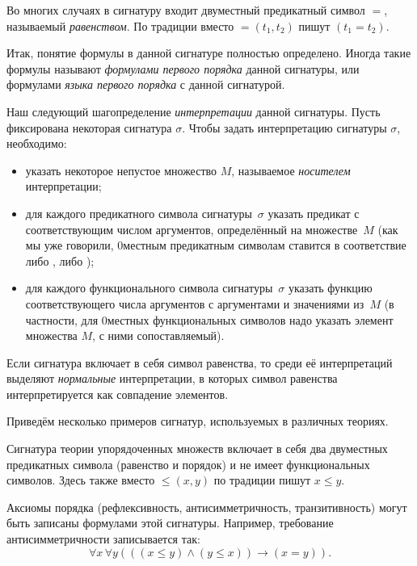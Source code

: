 Во многих случаях в сигнатуру входит двуместный предикатный
символ $=$, называемый \emph{равенством}.%
По традиции вместо $=(t_1,t_2)$ пишут $(t_1=t_2)$.

Итак, понятие формулы в данной сигнатуре полностью определено.
Иногда такие формулы называют \emph{формулами первого порядка}%
данной сигнатуры, или формулами \emph{языка первого порядка}%
с данной сигнатурой.

Наш следующий шаг\т определение \emph{интерпретации}%
данной
сигнатуры. Пусть фиксирована некоторая сигнатура $\sigma$. Чтобы
задать интерпретацию сигнатуры $\sigma$, необходимо:
\begin{itemize}
        \item
указать некоторое непустое множество $M$, называемое
\emph{носителем}%
%
интерпретации;
        \item
для каждого предикатного символа сигнатуры~$\sigma$ указать
предикат с соответствующим числом аргументов, определённый
на множестве~$M$ (как мы уже говорили,
$0$\д местным предикатным символам ставится в соответствие
либо \И, либо \Л);
        \item
для каждого функционального символа сигнатуры~$\sigma$
указать функцию соответствующего числа аргументов с аргументами
и значениями из~$M$ (в частности, для $0$\д местных функциональных
символов надо указать элемент множества $M$, с ними сопоставляемый).
\end{itemize}

Если сигнатура включает в себя символ равенства, то среди её
интерпретаций выделяют \emph{нормальные}%
%
интерпретации, в
которых символ равенства интерпретируется как совпадение
элементов.


Приведём несколько примеров сигнатур, используемых в различных
теориях.

Сигнатура теории упорядоченных множеств включает
в себя два двуместных предикатных символа (равенство и
порядок) и не имеет функциональных символов. Здесь также
вместо $\le(x,y)$ по традиции пишут $x \le y$.

Аксиомы порядка%
(рефлексивность, антисимметричность,
транзитивность) могут быть записаны формулами этой сигнатуры.
Например, требование антисимметричности записывается так:
        $$
\forall x\,\forall y (((x\le y)\land (y\le x))\to(x=y)).
        $$

